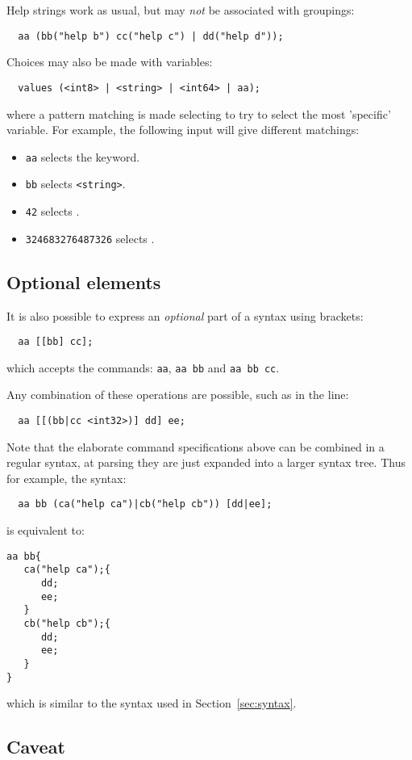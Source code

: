 \documentclass[a4paper, 10pt] {article}
\begin{document}
Help strings work as usual, but may \emph{not} be associated with
groupings:
\begin{verbatim}
  aa (bb("help b") cc("help c") | dd("help d"));
\end{verbatim}

Choices may also be made with variables:
\begin{verbatim}
  values (<int8> | <string> | <int64> | aa);
\end{verbatim}

where a pattern matching is made selecting to try to select the most 'specific'
variable. For example, the following input will give different matchings:
\begin{itemize}
\item
{\tt aa} selects the keyword.
\item
{\tt bb} selects {\tt <string>}.
\item
{\tt 42} selects {\tt <int8>}.
\item
{\tt 324683276487326} selects {\tt <int64>}.
\end{itemize} 

\subsection{Optional elements}
It is also possible to express an \emph{optional} part of a syntax
using brackets:
\begin{verbatim}
  aa [[bb] cc];
\end{verbatim}
which accepts the commands: {\tt aa}, {\tt aa bb} and  {\tt aa bb cc}.

Any combination of these operations are possible, such as in the line:
\begin{verbatim}
  aa [[(bb|cc <int32>)] dd] ee;
\end{verbatim}

Note that the elaborate command specifications above can be combined
in a regular syntax, at parsing they are just expanded into a larger
syntax tree. 
Thus for example, the syntax:
\begin{verbatim}
  aa bb (ca("help ca")|cb("help cb")) [dd|ee];
\end{verbatim}
is equivalent to:
\begin{verbatim}
aa bb{
   ca("help ca");{
      dd;
      ee;
   }
   cb("help cb");{
      dd;
      ee;
   }
}
\end{verbatim}
which is similar to the syntax used in Section~\ref{sec:syntax}.


\subsection{Caveat}
\end{document}

